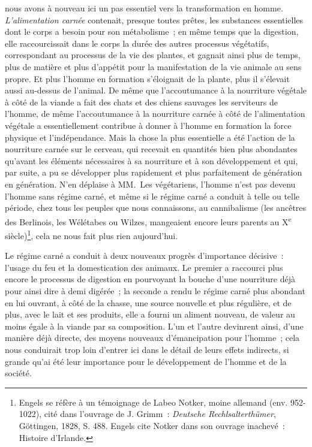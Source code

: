 \documentclass[french,twoside]{book} %
\begin{document}
nous avons à nouveau ici un pas essentiel vers la transformation en homme. \emph{L’alimentation carnée} contenait, presque toutes prêtes, les substances essentielles dont le corps a besoin pour son métabolisme ; en même temps que la digestion, elle raccourcissait dans le corps la durée des autres processus végétatifs, correspondant au processus de la vie des plantes, et gagnait ainsi plus de temps, plus de matière et plus d’appétit pour la manifestation de la vie animale au sens propre. Et plus l’homme en formation s’éloignait de la plante, plus il s’élevait aussi au-dessus de l’animal. De même que l’accoutumance à la nourriture végétale à côté de la viande a fait des chats et des chiens sauvages les serviteurs de l’homme, de même l’accoutumance à la nourriture carnée à côté de l’alimentation végétale a essentiellement contribue à donner à l’homme en formation la force physique et l’indépendance. Mais la chose la plus essentielle a été l’action de la nourriture carnée sur le cerveau, qui recevait en quantités bien plus abondantes qu’avant les éléments nécessaires à sa nourriture et à son développement et qui, par suite, a pu se développer plus rapidement et plus parfaitement de génération en génération. N’en déplaise à MM. Les végétariens, l’homme n’est pas devenu l’homme sans régime carné, et même si le régime carné a conduit à telle ou telle période, chez tous les peuples que nous connaissons, au cannibalisme (les ancêtres des Berlinois, les Wélétabes ou Wilzes, mangeaient encore leurs parents au X\textsuperscript{e} siècle)\footnote{Engels se réfère à un témoignage de Labeo Notker, moine allemand (env. 952-1022), cité dans l’ouvrage de J. Grimm : \emph{Deutsche Rechlsalterthümer}, Göttingen, 1828, S. 488. Engels cite Notker dans son ouvrage inachevé : Histoire d’Irlande.}, cela ne nous fait plus rien aujourd’hui.\par
Le régime carné a conduit à deux nouveaux progrès d’importance décisive : l’usage du feu et la domestication des animaux. Le premier a raccourci plus encore le processus de digestion en pourvoyant la bouche d’une nourriture déjà pour ainsi dire à demi digérée ; la seconde a rendu le régime carné plus abondant en lui ouvrant, à côté de la chasse, une source nouvelle et plus régulière, et de plus, avec le lait et ses produits, elle a fourni un aliment nouveau, de valeur au moins égale à la viande par sa composition. L’un et l’autre devinrent ainsi, d’une manière déjà directe, des moyens nouveaux d’émancipation pour l’homme ; cela nous conduirait trop loin d’entrer ici dans le détail de leurs effets indirects, si grande qu’ai été leur importance pour le développement de l’homme et de la société.\par
\end{document}
